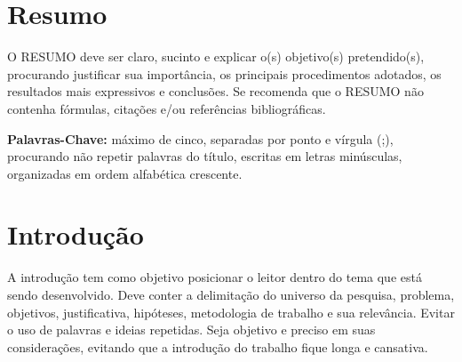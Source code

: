\documentclass[a0,portrait]{a0poster}
\begin{document}

\begin{multicols}{2} %

\justify %



\section*{Resumo}
\vspace{-1cm}
O RESUMO deve ser claro, sucinto e explicar o(s) objetivo(s) pretendido(s), procurando justificar sua import\^ancia, os principais procedimentos adotados, os resultados mais expressivos e conclus\~oes. Se recomenda que o RESUMO n\~ao contenha f\'ormulas, cita\c c\~oes e/ou refer\^encias bibliogr\'aficas.

\vspace{1cm}

\hspace{-0,5cm}\textbf{Palavras-Chave:} m\'aximo de cinco, separadas por ponto e v\'i­rgula (;), procurando n\~ao repetir palavras do t\'i­tulo, escritas em letras min\'usculas, organizadas em ordem alfab\'etica crescente. 


\section*{Introdu\c c\~ao}
\vspace{-1cm}
A introdu\c c\~ao tem como objetivo posicionar o leitor dentro do tema que est\'a sendo desenvolvido. Deve conter a delimita\c c\~ao do universo da pesquisa, problema, objetivos, justificativa, hip\'oteses, metodologia de trabalho e sua relev\^ancia. Evitar o uso de palavras e ideias repetidas. Seja objetivo e preciso em suas considera\c c\~oes, evitando que a introdu\c c\~ao do trabalho fique longa e cansativa. 


\end{multicols}
\end{document}
